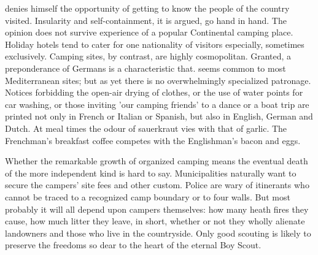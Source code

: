 \documentclass[kindlepaper]{BHCexam4kindle}
\begin{document}
denies himself the opportunity of getting to know the people of the country visited. Insularity and
self-containment, it is argued, go hand in hand. The opinion does not survive experience of a popular
Continental camping place. Holiday hotels tend to cater for one nationality of visitors especially, sometimes
exclusively. Camping sites, by contrast, are highly cosmopolitan. Granted, a preponderance of Germans is a
characteristic that. seems common to most Mediterranean sites; but as yet there is no overwhelmingly
specialized patronage. Notices forbidding the open-air drying of clothes, or the use of water points for car
washing, or those inviting 'our camping friends' to a dance or a boat trip are printed not only in French or
Italian or Spanish, but also in English, German and Dutch. At meal times the odour of sauerkraut vies with that
of garlic. The Frenchman's breakfast coffee competes with the Englishman's bacon and eggs.
\par
Whether the remarkable growth of organized camping means the eventual death of the more independent kind
is hard to say. Municipalities naturally want to secure the campers' site fees and other custom. Police are wary
of itinerants who cannot be traced to a recognized camp boundary or to four walls. But most probably it will all
depend upon campers themselves: how many heath fires they cause, how much litter they leave, in short,
whether or not they wholly alienate landowners and those who live in the countryside. Only good scouting is
likely to preserve the freedoms so dear to the heart of the eternal Boy Scout.
\clearpage
\end{document}
